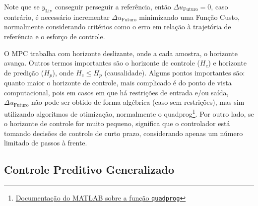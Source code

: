 \documentclass[12pt,           %
a4paper,                       %
openany,                       %
oneside,                       %
chapter=TITLE,                 %
english,                       %
spanish,                       %
brazil,                        %
sumario=tradicional]{abntex2}  %
\begin{document}
\begin{OnehalfSpace}
\begin{figure}[H]
\label{fig:GCPBM}
\end{figure}
\vspace*{-0.7cm}
{\raggedright {}}

Note que se $y_{\text{Liv}}$ conseguir perseguir a referência, então $\Delta u_{\text{Futuro}} = 0$, caso contrário, é necessário incrementar $\Delta u_{\text{Futuro}}$ minimizando uma Função Custo, normalmente considerando critérios como o erro em relação à trajetória de referência e o esforço de controle.

O MPC trabalha com horizonte deslizante, onde a cada amostra, o horizonte avança. Outros termos importantes são o horizonte de controle ($H_c$) e horizonte de predição ($H_p$), onde $H_c\leq H_p$ (causalidade). Alguns pontos importantes são: quanto maior o horizonte de controle, mais complicado é do ponto de vista computacional, pois em casos em que há restrições de entrada e/ou saída, $\Delta u_{\text{Futuro}}$ não pode ser obtido de forma algébrica (caso sem restrições), mas sim utilizando algoritmos de otimização, normalmente o quadprog\footnote{\href{https://www.mathworks.com/help/optim/ug/quadprog.html}{Documentação do MATLAB sobre a função \texttt{quadprog}}}. Por outro lado, se o horizonte de controle for muito pequeno, significa que o controlador está tomando decisões de controle de curto prazo, considerando apenas um número limitado de passos à frente.

\subsection{Controle Preditivo Generalizado}
\label{sec:CPG}


\end{OnehalfSpace}
\end{document}
